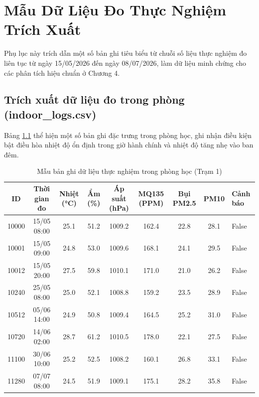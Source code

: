 \chapter{Mẫu Dữ Liệu Đo Thực Nghiệm Trích Xuất}
\label{app:sampledata}

Phụ lục này trích dẫn một số bản ghi tiêu biểu từ chuỗi số liệu thực nghiệm đo liên tục từ ngày 15/05/2026 đến ngày 08/07/2026, làm dữ liệu minh chứng cho các phân tích hiệu chuẩn ở Chương 4.

\section{Trích xuất dữ liệu đo trong phòng (indoor\_logs.csv)}
Bảng \ref{tab:sampleindoordata} thể hiện một số bản ghi đặc trưng trong phòng học, ghi nhận điều kiện bật điều hòa nhiệt độ ổn định trong giờ hành chính và nhiệt độ tăng nhẹ vào ban đêm.

\begin{table}[H]
\centering
\caption{Mẫu bản ghi dữ liệu thực nghiệm trong phòng học (Trạm 1)}
\label{tab:sampleindoordata}
\begin{small}
\begin{tabular}{ccccccccl}
\toprule
\textbf{ID} & \textbf{Thời gian đo} & \textbf{Nhiệt (°C)} & \textbf{Ẩm (\%)} & \textbf{Áp suất (hPa)} & \textbf{MQ135 (PPM)} & \textbf{Bụi PM2.5} & \textbf{PM10} & \textbf{Cảnh báo} \\
\midrule
10000 & 15/05 08:00 & 25.1 & 51.2 & 1009.2 & 162.4 & 22.8 & 28.1 & False \\
10001 & 15/05 09:00 & 24.8 & 53.0 & 1009.6 & 168.1 & 24.1 & 29.5 & False \\
10012 & 15/05 20:00 & 27.5 & 59.8 & 1010.1 & 171.0 & 21.0 & 26.2 & False \\
10240 & 25/05 08:00 & 25.0 & 52.1 & 1008.8 & 159.2 & 23.5 & 28.9 & False \\
10512 & 05/06 14:00 & 24.9 & 50.8 & 1009.4 & 164.5 & 25.2 & 31.0 & False \\
10720 & 14/06 02:00 & 28.7 & 61.2 & 1010.5 & 178.0 & 22.1 & 27.5 & False \\
11100 & 30/06 10:00 & 25.2 & 52.5 & 1008.2 & 160.1 & 26.8 & 33.1 & False \\
11280 & 07/07 08:00 & 24.5 & 51.9 & 1009.1 & 175.1 & 28.2 & 35.8 & False \\
\bottomrule
\end{tabular}
\end{small}
\end{table}

